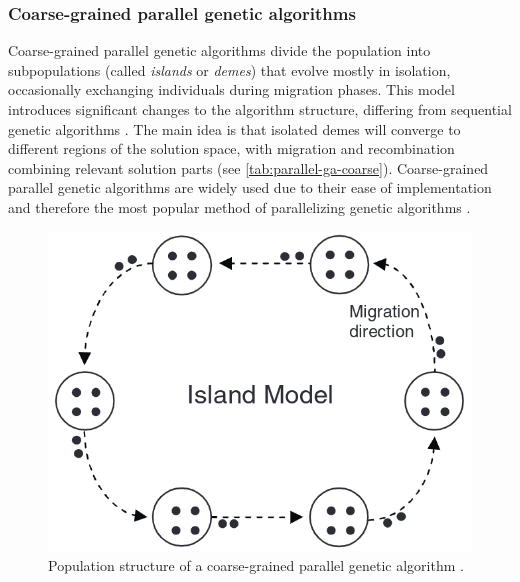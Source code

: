 \documentclass[sigconf]{acmart}
\begin{document}
\subsubsection{Coarse-grained parallel genetic algorithms}
Coarse-grained parallel genetic algorithms divide the population into
subpopulations (called \textit{islands} or \textit{demes}) that evolve mostly
in isolation, occasionally exchanging individuals during migration phases.
This model introduces significant changes to the algorithm structure,
differing from sequential genetic algorithms \cite{Affenzeller2009}.
The main idea is that isolated demes will converge to different regions of the
solution space, with migration and recombination combining relevant solution
parts (see \autoref{tab:parallel-ga-coarse})\cite{Affenzeller2009}.
Coarse-grained parallel genetic algorithms are widely used due to their
ease of implementation and therefore the most popular method of
parallelizing genetic algorithms \cite{Affenzeller2009}.
\begin{figure}[h]
  \includegraphics[scale=0.24]{assets/parallel-ga-coarse.png}
  \caption{
    Population structure of a coarse-grained parallel genetic algorithm
    \cite{Affenzeller2009}.
  }
  \label{tab:parallel-ga-coarse}
\end{figure}
\end{document}
